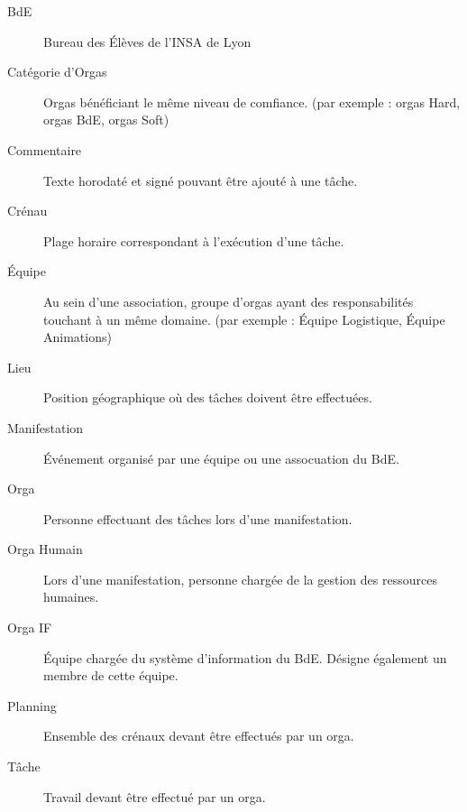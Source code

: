\begin{description}
\item[BdE] Bureau des Élèves de l'INSA de Lyon
\item[Catégorie d'Orgas] Orgas bénéficiant le même niveau de comfiance. (par exemple : orgas Hard, orgas BdE, orgas Soft)
\item[Commentaire] Texte horodaté et signé pouvant être ajouté à une tâche.

\item[Crénau] Plage horaire correspondant à l'exécution d'une tâche.
\item[Équipe] Au sein d'une association, groupe d'orgas ayant des responsabilités touchant à un même domaine. (par exemple : Équipe Logistique, Équipe Animations)
\item[Lieu] Position géographique où des tâches doivent être effectuées.
\item[Manifestation] Événement organisé par une équipe ou une assocuation du BdE.
\item[Orga] Personne effectuant des tâches lors d'une manifestation.
\item[Orga Humain] Lors d'une manifestation, personne chargée de la gestion des ressources humaines.
\item[Orga IF] Équipe chargée du système d'information du BdE. Désigne également un membre de cette équipe.
\item[Planning] Ensemble des crénaux devant être effectués par un orga.
\item[Tâche] Travail devant être effectué par un orga.

 \end{description}